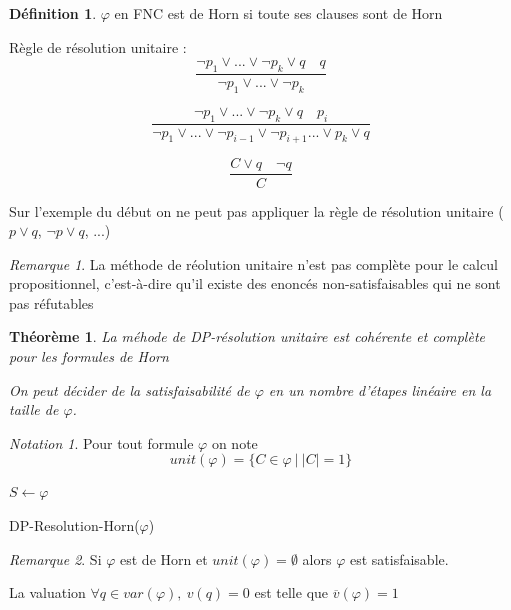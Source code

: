\documentclass[]{article}
\newtheorem{mythm}{Théorème}
\theoremstyle{remark}
\newtheorem{mynot}{Notation}
\newtheorem{myrem}{Remarque}
\theoremstyle{definition}
\newtheorem{mydef}{Définition}
\begin{document}
\begin{mydef}
	$\varphi$ en FNC est de Horn si toute ses clauses sont de Horn
\end{mydef}

Règle de résolution unitaire :
$$\frac{\neg p_1 \lor ... \lor \neg p_k \lor q \quad q}{\neg p_1 \lor ... \lor \neg p_k}$$

$$\frac{\neg p_1 \lor ... \lor \neg p_k \lor q \quad p_i}{\neg p_1 \lor ... \lor \neg p_{i-1} \lor \neg p_{i+1} ...\lor p_k \lor q}$$

$$\frac{C \lor q \quad \neg q}{C}$$

Sur l'exemple du début on ne peut pas appliquer la règle de résolution unitaire ($p \lor q$, $\neg p \lor q$, ...)

\begin{myrem}
	La méthode de réolution unitaire n'est pas complète pour le calcul propositionnel, c'est-à-dire qu'il existe des enoncés non-satisfaisables qui ne sont pas réfutables
\end{myrem}

\begin{mythm}
	La méhode de DP-résolution unitaire est cohérente et complète pour les formules de Horn
	
	On peut décider de la satisfaisabilité de $\varphi$ en un nombre d'étapes linéaire en la taille de $\varphi$.
\end{mythm}

\begin{mynot}
	Pour tout formule $\varphi$ on note $$unit(\varphi) = \{C \in \varphi ~ | ~ |C| = 1 \}$$
\end{mynot}

\begin{algorithm}
	$S \leftarrow \varphi$ \\
	\caption{DP-Resolution-Horn($\varphi$)}
\end{algorithm}

\begin{myrem}
	Si $\varphi$ est de Horn et $unit(\varphi) = \emptyset$ alors $\varphi$ est satisfaisable.
	
	La valuation $\forall q \in var(\varphi), ~ v(q) = 0$ est telle que $\overline{v}(\varphi)=1$
\end{myrem}
\end{document}
